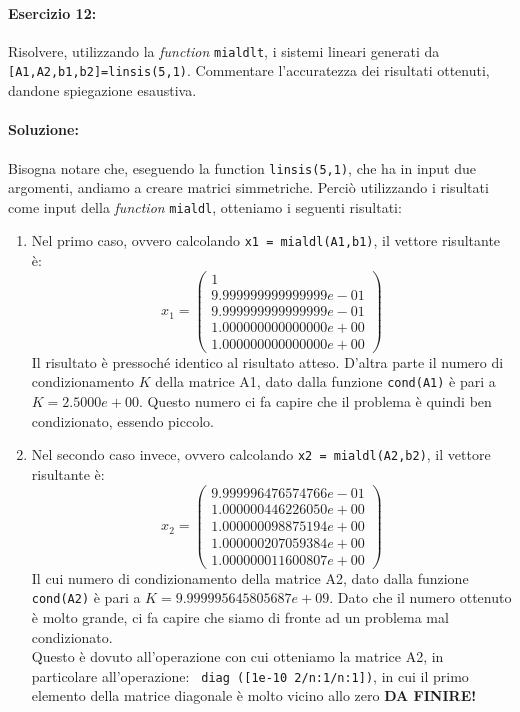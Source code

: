 \documentclass[12pt]{article}
\begin{document}
\paragraph{Esercizio 12:} Risolvere, utilizzando la \textit{function} \texttt{mialdlt}, i sistemi lineari generati da\\ \texttt{[A1,A2,b1,b2]=linsis(5,1)}. 
Commentare l’accuratezza dei risultati ottenuti, dandone spiegazione esaustiva.
\paragraph{Soluzione:}
Bisogna notare che, eseguendo la function \texttt{linsis(5,1)}, che ha in input due
 argomenti, andiamo a creare matrici simmetriche. Perciò utilizzando i risultati come input
della \textit{function} \texttt{mialdl}, otteniamo i seguenti risultati:
\begin{enumerate}
    \item Nel primo caso, ovvero calcolando \texttt{x1 = mialdl(A1,b1)}, il vettore risultante è: 
    \begin{equation*} x_1=
        \begin{pmatrix}
            1\\
            9.999999999999999e-01\\
            9.999999999999999e-01\\
            1.000000000000000e+00\\
            1.000000000000000e+00
        \end{pmatrix}
    \end{equation*}
    Il risultato è pressoché identico al risultato atteso. D'altra parte il numero di condizionamento \(K\) della matrice A1, dato dalla funzione \texttt{cond(A1)}
    è pari a \(K = 2.5000e+00\). Questo numero ci fa capire che il problema è quindi ben condizionato, essendo piccolo.
    \item Nel secondo caso invece, ovvero calcolando \texttt{x2 = mialdl(A2,b2)}, il vettore risultante è:
    \begin{equation*} x_2=
        \begin{pmatrix}
            9.999996476574766e-01\\
            1.000000446226050e+00\\
            1.000000098875194e+00\\
            1.000000207059384e+00\\
            1.000000011600807e+00
        \end{pmatrix}
    \end{equation*}
    Il cui numero di condizionamento della matrice A2, dato dalla funzione \texttt{cond(A2)} è pari a \(K = 9.999995645805687e+09\). Dato che il numero ottenuto è molto 
    grande, ci fa capire che siamo di fronte ad un problema mal condizionato. \\
    Questo è dovuto all'operazione con cui otteniamo la matrice A2, in particolare all'operazione: \texttt{ diag ([1e-10 2/n:1/n:1])}, in cui il primo elemento della matrice 
    diagonale è molto vicino allo zero
    \textbf{DA FINIRE!}
\end{enumerate}
\end{document}
